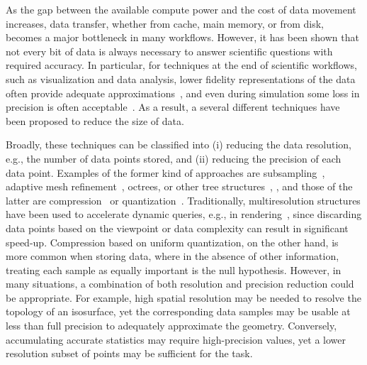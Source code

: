 As the gap between the available compute power and the cost of data movement
increases, data transfer, whether from cache, main memory, or from disk,
becomes a major bottleneck in many workflows. However, it has been shown that
not every bit of data is always necessary to answer scientific questions with
required accuracy. In particular, for techniques at the end of scientific
workflows, such as visualization and data analysis, lower fidelity
representations of the data often provide adequate
approximations~\cite{woodring2011,covra2012,compression_sim2013}, and even
during simulation some loss in precision is often
acceptable~\cite{compression_sim2013,doi:10.1177/1094342018762036}. As a
result, a several different techniques have been proposed to reduce the size
of data. 

Broadly, these techniques can be classified into (i) reducing the data
resolution, e.g., the number of data points stored, and (ii) reducing the
precision of each data point.  Examples of the former kind of approaches are subsampling~\cite{Pascucci01sc},
adaptive mesh refinement~\cite{amr1989}, octrees, or other tree
structures~\cite{hierarchical1984}, , and those of the
latter are compression~\cite{fpzip,isabela,zfp2014,sz} or
quantization~\cite{vq1992,compression_domain2003,sqe}. Traditionally,
multiresolution structures have been used to accelerate dynamic queries, e.g.,
in rendering~\cite{multires_octree1999}, since discarding data points based on
the viewpoint or data complexity can result in significant speed-up.
Compression based on uniform quantization, on the other hand, is more common
when storing data, where in the absence of other information, treating each
sample as equally important is the null hypothesis. However, in many
situations, a combination of both resolution and precision reduction could be
appropriate.  For example, high spatial resolution may be needed to resolve the
topology of an isosurface, yet the corresponding data samples may be usable at
less than full precision to adequately approximate the geometry.  Conversely,
accumulating accurate statistics may require high-precision values, yet
a lower resolution subset of points may be sufficient for the task. 

